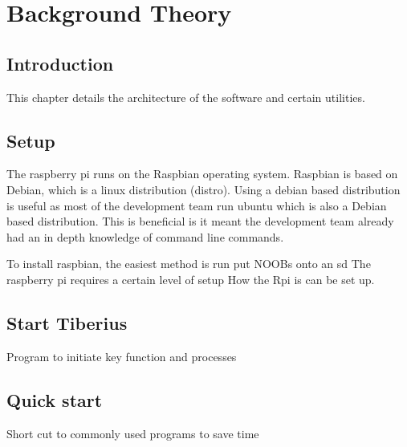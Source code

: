 \section{Background Theory}


\pagestyle{aidan}

\subsection{Introduction}
This chapter details the architecture of the software and certain utilities.

\subsection{Setup}
The raspberry pi runs on the Raspbian operating system. Raspbian is based on Debian, which is a linux distribution (distro). Using a debian based distribution is useful as most of the development team run ubuntu which is also a Debian based distribution. This is beneficial is it meant the development team already had an in depth knowledge of command line commands.

To install raspbian, the easiest method is run put NOOBs onto an sd 
The raspberry pi requires a certain level of setup
How the Rpi is can be set up.

\subsection{Start Tiberius}
Program to initiate key function and processes

\subsection{Quick start}
Short cut to commonly used programs to save time













